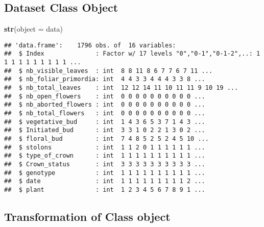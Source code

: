 \documentclass[]{article}
\newenvironment{Shaded}{\begin{snugshade}}{\end{snugshade}}
\newcommand{\KeywordTok}[1]{\textcolor[rgb]{0.13,0.29,0.53}{\textbf{#1}}}
\newcommand{\DataTypeTok}[1]{\textcolor[rgb]{0.13,0.29,0.53}{#1}}
\newcommand{\StringTok}[1]{\textcolor[rgb]{0.31,0.60,0.02}{#1}}
\newcommand{\OperatorTok}[1]{\textcolor[rgb]{0.81,0.36,0.00}{\textbf{#1}}}
\newcommand{\NormalTok}[1]{#1}
\begin{document}
\subsection{Dataset Class Object}\label{dataset-class-object}

\begin{Shaded}
\begin{Highlighting}[]
\KeywordTok{str}\NormalTok{(}\DataTypeTok{object =}\NormalTok{ data)}
\end{Highlighting}
\end{Shaded}

\begin{verbatim}
## 'data.frame':    1796 obs. of  16 variables:
##  $ Index              : Factor w/ 17 levels "0","0-1","0-1-2",..: 1 1 1 1 1 1 1 1 1 1 ...
##  $ nb_visible_leaves  : int  8 8 11 8 6 7 7 6 7 11 ...
##  $ nb_foliar_primordia: int  4 4 3 3 4 4 4 3 3 8 ...
##  $ nb_total_leaves    : int  12 12 14 11 10 11 11 9 10 19 ...
##  $ nb_open_flowers    : int  0 0 0 0 0 0 0 0 0 0 ...
##  $ nb_aborted_flowers : int  0 0 0 0 0 0 0 0 0 0 ...
##  $ nb_total_flowers   : int  0 0 0 0 0 0 0 0 0 0 ...
##  $ vegetative_bud     : int  1 4 3 6 5 3 7 1 4 3 ...
##  $ Initiated_bud      : int  3 3 1 0 2 2 1 3 0 2 ...
##  $ floral_bud         : int  7 4 8 5 2 5 2 4 5 10 ...
##  $ stolons            : int  1 1 2 0 1 1 1 1 1 1 ...
##  $ type_of_crown      : int  1 1 1 1 1 1 1 1 1 1 ...
##  $ Crown_status       : int  3 3 3 3 3 3 3 3 3 3 ...
##  $ genotype           : int  1 1 1 1 1 1 1 1 1 1 ...
##  $ date               : int  1 1 1 1 1 1 1 1 1 2 ...
##  $ plant              : int  1 2 3 4 5 6 7 8 9 1 ...
\end{verbatim}

\subsection{Transformation of Class
object}\label{transformation-of-class-object}

\begin{Shaded}
\end{Shaded}
\end{document}
